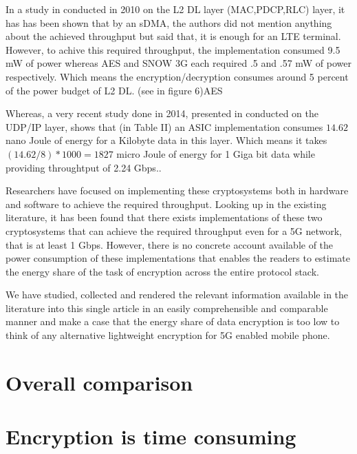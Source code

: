 In a study in 
 conducted in 2010 on the L2 DL layer (MAC,PDCP,RLC) layer, it has has been shown that by an sDMA, the authors did not mention anything about the achieved throughput but said that, it is enough for an LTE terminal. However, to achive this required throughput, the implementation consumed 9.5 mW of power whereas AES and SNOW 3G each required .5 and .57 mW of power respectively. Which means the encryption/decryption consumes around 5 percent of the power budget of L2 DL. (see in figure 6)AES

Whereas, a very recent study done in 2014, presented in 
conducted on the UDP/IP layer, shows that (in Table II) an ASIC implementation consumes $14.62$ nano Joule of energy for a Kilobyte data in this layer. Which means it takes $(14.62/8)*1000 = 1827$ micro Joule of energy for 1 Giga bit data while providing throughtput of 2.24 Gbps..

Researchers have focused on implementing these cryptosystems both in hardware and software to achieve the required throughput. Looking up in the existing literature, it has been found that there exists implementations of these two cryptosystems that can achieve the required throughput even for a 5G network, that is at least 1 Gbps. However, there is no concrete account available of the power consumption of these implementations that enables the readers to estimate the energy share of the task of encryption across the entire protocol stack.

We have studied, collected and rendered the relevant information available in the literature into this single article in an easily comprehensible and comparable manner and make a case that the energy share of data encryption is too low to think of any alternative lightweight encryption for 5G enabled mobile phone.



\section{Overall comparison}
\label{sec:overall_comparison}

\section{Encryption is time consuming}
\label{sec:encryption_is_time_consuming}







